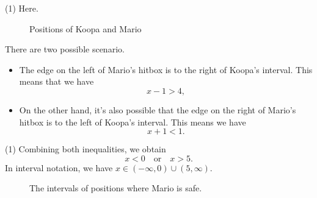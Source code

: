 \begin{frame}
\begin{sol}
\begin{tasks}(1)
\task Here.
\begin{figure}[h!]
\centering
{}
\caption{Positions of Koopa and Mario}
\end{figure}
\task There are two possible scenario.
\begin{itemize}
\item The edge on the left of Mario's hitbox is to the right of Koopa's interval. This means that we have
\[x-1 > 4,\]
\item On the other hand, it's also possible that the edge on the right of Mario's hitbox is to the left of Koopa's interval. This means we have
\[x+1 < 1.\]
\end{itemize}
\end{tasks}
\end{sol}
\end{frame}

\begin{frame}
\begin{sol}
\begin{tasks}(1)
\task Combining both inequalities, we obtain
\[x < 0 \quad \text{or} \quad x > 5.\]
In interval notation, we have $x \in (-\infty, 0) \cup (5, \infty)$.
\end{tasks}
\begin{figure}[h!]
\centering
{}
\caption{The intervals of positions where Mario is safe.}
\end{figure}
\end{sol}
\end{frame}




